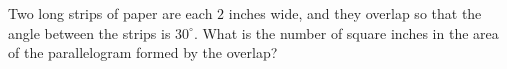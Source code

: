 Two long strips of paper are each $2$ inches wide, and they overlap so that the angle between the strips is $30^\circ$. What is the number of square inches in the area of the parallelogram formed by the overlap?
